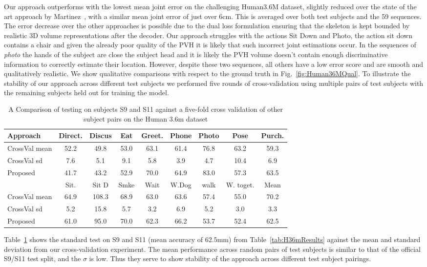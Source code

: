 \documentclass[runningheads]{llncs}
\begin{document}
Our approach outperforms with the lowest mean joint error on the challenging Human3.6M dataset, slightly reduced over the state of the art approach by Martinez~\cite{martinez_simple_2017}, with a similar mean joint error of just over 6cm. This is averaged over both test subjects and the 59 sequences. The error decrease over the other approaches is possible due to the dual loss formulation ensuring that the skeleton is kept bounded by realistic 3D volume representations after the decoder. Our approach struggles with the actions Sit Down and Photo, the action sit down contains a chair and given the already poor quality of the PVH it is likely that such incorrect joint estimations occur. In the sequences of \emph{photo} the hands of the subject are close the subject head and it is likely the PVH volume doesn't contain enough discriminative information to correctly estimate their location. However, despite these two sequences, all others have a low error score and are smooth and qualitatively realistic. We show qualitative comparisons with respect to the ground truth in Fig.~\ref{fig:Human36MQual}. To illustrate the stability of our approach across different test subjects we performed five rounds of cross-validation using multiple pairs of test subjects with the remaining subjects held out for training the model.
\begin{table}[htb]

\centering
{
\small
\begin{tabular}{lcccccccc}
\hline
Approach      & Direct. & Discus & Eat & Greet. &Phone &Photo &Pose &Purch. \\ \hline

CrossVal mean & 52.2    & 49.8   & 53.0&63.1    &61.4  &76.8  &63.2 &59.3   \\
CrossVal sd   & 7.6     & 5.1    & 9.1 &5.8     &3.9   &4.7   &10.4 & 6.9   \\ \hline
Proposed      & 41.7& 43.2& 52.9& 70.0& 64.9& 83.0& 57.3& 63.5\\ \hline

              & Sit. & Sit D & Smke & Wait &W.Dog& walk & W. toget. &Mean\\\hline
CrossVal mean & 64.9 & 108.3 &68.9  &63.0  &63.6 &57.4  &55.0       &70.2  \\
CrossVal sd   & 5.2  &15.8   &5.7   &3.2   &6.9  &5.2   &3.0        &3.3\\ \hline
Proposed      &61.0 &95.0 &70.0 &62.3 &66.2 &53.7 &52.4 &62.5 \\     \hline

\end{tabular}}
\caption{A Comparison of testing on subjects S9 and S11 against a five-fold cross validation of other subject pairs on the Human 3.6m dataset}
\label{tab:H36mResultsCrossVal}
\squeezeup
\squeezeup
\end{table}
Table~\ref{tab:H36mResultsCrossVal} shows the standard test on S9 and S11 (mean accuracy of 62.5mm) from Table~\ref{tab:H36mResults} against the mean and standard deviation from our cross-validation experiment. The mean performance across random pairs of test subjects is similar to that of the official S9/S11 test split, and the $\sigma$ is low.  Thus they serve to show stability of the approach across different test subject pairings. 
\end{document}
